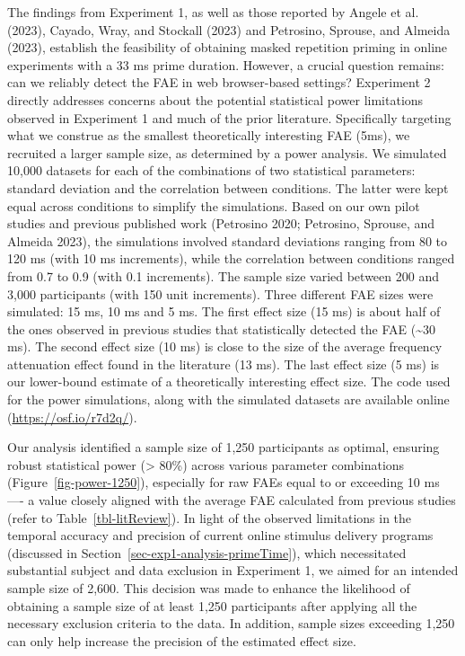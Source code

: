 \documentclass[
]{interact}
\begin{document}
The findings from Experiment 1, as well as those reported by Angele et
al. (2023), Cayado, Wray, and Stockall (2023) and Petrosino, Sprouse,
and Almeida (2023), establish the feasibility of obtaining masked
repetition priming in online experiments with a 33 ms prime duration.
However, a crucial question remains: can we reliably detect the FAE in
web browser-based settings? Experiment 2 directly addresses concerns
about the potential statistical power limitations observed in Experiment
1 and much of the prior literature. Specifically targeting what we
construe as the smallest theoretically interesting FAE (5ms), we
recruited a larger sample size, as determined by a power analysis. We
simulated 10,000 datasets for each of the combinations of two
statistical parameters: standard deviation and the correlation between
conditions. The latter were kept equal across conditions to simplify the
simulations. Based on our own pilot studies and previous published work
(Petrosino 2020; Petrosino, Sprouse, and Almeida 2023), the simulations
involved standard deviations ranging from 80 to 120 ms (with 10 ms
increments), while the correlation between conditions ranged from 0.7 to
0.9 (with 0.1 increments). The sample size varied between 200 and 3,000
participants (with 150 unit increments). Three different FAE sizes were
simulated: 15 ms, 10 ms and 5 ms. The first effect size (15 ms) is about
half of the ones observed in previous studies that statistically
detected the FAE (\textasciitilde30 ms). The second effect size (10 ms)
is close to the size of the average frequency attenuation effect found
in the literature (13 ms). The last effect size (5 ms) is our
lower-bound estimate of a theoretically interesting effect size. The
code used for the power simulations, along with the simulated datasets
are available online (\url{https://osf.io/r7d2q/}).

Our analysis identified a sample size of 1,250 participants as optimal,
ensuring robust statistical power (\textgreater{} 80\%) across various
parameter combinations (Figure~\ref{fig-power-1250}), especially for raw
FAEs equal to or exceeding 10 ms ---- a value closely aligned with the
average FAE calculated from previous studies (refer to
Table~\ref{tbl-litReview}). In light of the observed limitations in the
temporal accuracy and precision of current online stimulus delivery
programs (discussed in Section~\ref{sec-exp1-analysis-primeTime}), which
necessitated substantial subject and data exclusion in Experiment 1, we
aimed for an intended sample size of 2,600. This decision was made to
enhance the likelihood of obtaining a sample size of at least 1,250
participants after applying all the necessary exclusion criteria to the
data. In addition, sample sizes exceeding 1,250 can only help increase
the precision of the estimated effect size.
\end{document}
